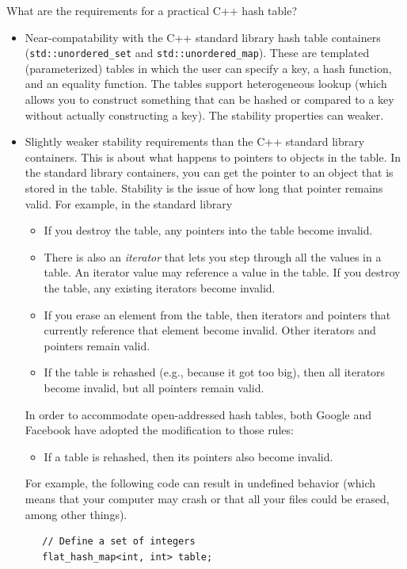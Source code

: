 \documentclass[10pt]{article}
\theoremstyle{remark}
\theoremstyle{remark}
\begin{document}
What are the requirements for a practical C++ hash table?
\begin{itemize}
\item Near-compatability with the C++ standard library hash table
  containers (\texttt{std::unordered\_set} and
  \texttt{std::unordered\_map}).  These are templated (parameterized)
  tables in which the user can specify a key, a hash function, and an
  equality function.  The tables support heterogeneous lookup (which
  allows you to construct something that can be hashed or compared to
  a key without actually constructing a key).  The stability
  properties can weaker.
    
\item Slightly weaker stability requirements than the C++ standard library containers.  This is about what happens to pointers to objects in the table.  In the standard library containers, you can get the pointer to an object that is stored in the table. Stability is the issue of how long that pointer remains valid.  For example, in the standard library
  \begin{itemize}
    \item If you destroy the table, any pointers into the table become invalid.
    \item There is also an \textit{iterator} that lets you step
      through all the values in a table.  An iterator value may
      reference a value in the table.  If you destroy the table, any
      existing iterators become invalid.
    \item If you erase an element from the table, then iterators and
      pointers that currently reference that element become invalid.
      Other iterators and pointers remain valid.
    \item If the table is rehashed (e.g., because it got too big),
      then all iterators become invalid, but all pointers remain valid.
   \end{itemize}

  In order to accommodate open-addressed hash tables, both Google and
  Facebook have adopted the modification to those rules:
  \begin{itemize}
  \item  If a table is rehashed, then its pointers also become invalid.
  \end{itemize}

   For example, the following code can result in undefined behavior
   (which means that your computer may crash or that all your files
   could be erased, among other things).
\begin{verbatim}
   // Define a set of integers
   flat_hash_map<int, int> table;
   

\end{verbatim}
\end{itemize}
\end{document}
